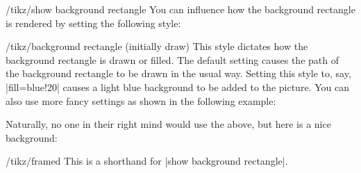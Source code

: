 \begin{stylekey}{/tikz/show background rectangle}
    You can influence how the background rectangle is rendered by setting the
    following style:
    \begin{stylekey}{/tikz/background rectangle (initially draw)}
        This style dictates how the background rectangle is drawn or filled.
        The default setting causes the path of the background rectangle to be
        drawn in the usual way. Setting this style to, say, |fill=blue!20|
        causes a light blue background to be added to the picture. You can also
        use more fancy settings as shown in the following example:
\begin{codeexample}[preamble={\usetikzlibrary{backgrounds}}]
\end{codeexample}
        Naturally, no one in their right mind would use the above, but here is
        a nice background:
\begin{codeexample}[preamble={\usetikzlibrary{backgrounds}}]
\end{codeexample}
    \end{stylekey}
\end{stylekey}

\begin{stylekey}{/tikz/framed}
    This is a shorthand for |show background rectangle|.
\end{stylekey}

